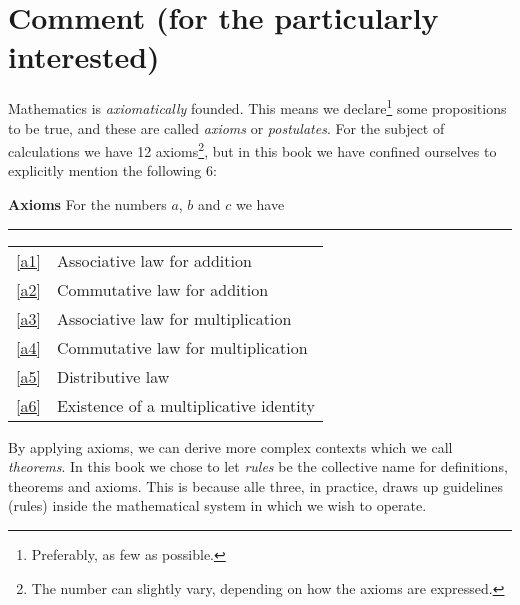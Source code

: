



	
\section*{Comment (for the particularly interested) \label{Kommentar1}}
Mathematics is \textit{axiomatically} founded. This means we declare\footnote{Preferably, as few as possible.} some propositions to be true, and these are called \textit{axioms} or \textit{postulates}. For the subject of calculations we have 12 axioms\footnote{The number can slightly vary, depending on how the axioms are expressed.}, but in this book we have confined ourselves to explicitly mention the following 6:
\regv 

\begin{tcolorbox}[boxrule=0.3 mm,arc=0mm,colback=blue!5] {\large \textbf{Axioms} \vspace{5 pt}}\newline
For the numbers $ a $, $ b $ and $ c $ we have
\rule{1\linewidth}{0.75bp}
\begin{center}
	\begin{tabular}{rl}
		\eqref{a1} &Associative law for addition\\
		\eqref{a2} & Commutative law for addition \\	
		\eqref{a3} & Associative law for multiplication \\
		\eqref{a4} & Commutative law for multiplication \\		
		\eqref{a5} & Distributive law\\	
		\eqref{a6} & Existence of a multiplicative identity
	\end{tabular}
\end{center}
\end{tcolorbox}
\vsk
By applying axioms, we can derive more complex contexts which we call \textit{theorems}. In this book we chose to let \textsl{rules} be the collective name for definitions, theorems and axioms. This is because alle three, in practice, draws up guidelines (rules) inside the mathematical system in which we wish to operate.\vsk
